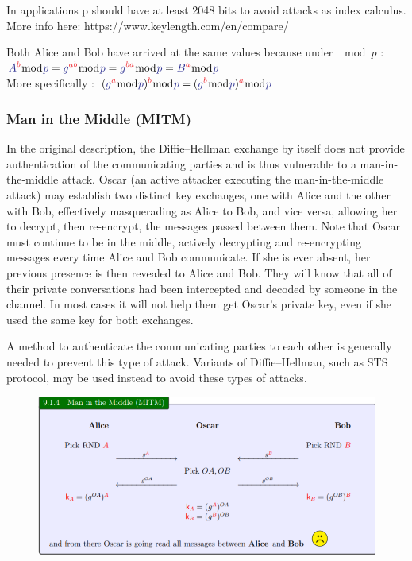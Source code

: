 \documentclass{article}
\begin{document}
\begin{enumerate}
In applications p should have at least 2048 bits to avoid attacks as index calculus. More info
here: https://www.keylength.com/en/compare/

Both Alice and Bob have arrived at the same values because under $\mod p$ :$ {\displaystyle {\color {Blue}A }^{\color {Red}b}{\bmod {\color {Blue}p}}={\color {Blue}g}^{\color {Red}ab}{\bmod {\color {Blue}p}}={\color {Blue}g}^{\color {Red}ba}{\bmod {\color {Blue}p}}={\color {Blue}B}^{\color {Red}a}{\bmod {\color {Blue}p}}}$\\ More specifically : ${\displaystyle ({\color {Blue}g}^{\color {Red}a}{\bmod {\color {Blue}p}})^{\color {Red}b}{\bmod {\color {Blue}p}}=({\color {Blue}g}^{\color {Red}b}{\bmod {\color {Blue}p}})^{\color {Red}a}{\bmod {\color {Blue}p}}}$\\

\subsubsection{Man in the Middle (MITM)}
In the original description, the Diffie–Hellman exchange by itself does not provide authentication of the communicating parties and is thus vulnerable to a man-in-the-middle attack. Oscar (an active attacker executing the man-in-the-middle attack) may establish two distinct key exchanges, one with Alice and the other with Bob, effectively masquerading as Alice to Bob, and vice versa, allowing her to decrypt, then re-encrypt, the messages passed between them. Note that Oscar must continue to be in the middle, actively decrypting and re-encrypting messages every time Alice and Bob communicate. If she is ever absent, her previous presence is then revealed to Alice and Bob. They will know that all of their private conversations had been intercepted and decoded by someone in the channel. In most cases it will not help them get Oscar's private key, even if she used the same key for both exchanges.

A method to authenticate the communicating parties to each other is generally needed to prevent this type of attack. Variants of Diffie–Hellman, such as STS protocol, may be used instead to avoid these types of attacks.
\begin{figure}[htb]
	\begin{center}
  		\includegraphics[width=1 \textwidth]{MITM.png}
 	\end{center}
 	\caption{}
 	\label{ciphering}
\end{figure}





\end{enumerate}
\end{document}
